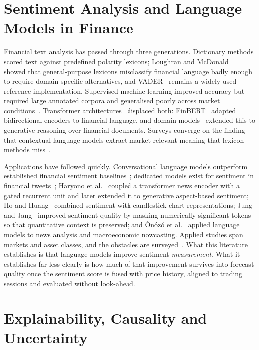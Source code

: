 \section{Sentiment Analysis and Language Models in Finance}

Financial text analysis has passed through three generations. Dictionary methods scored text
against predefined polarity lexicons; Loughran and McDonald~\cite{loughran2011} showed that
general-purpose lexicons misclassify financial language badly enough to require domain-specific
alternatives, and VADER~\cite{hutto2014} remains a widely used reference implementation.
Supervised machine learning improved accuracy but required large annotated corpora and
generalised poorly across market conditions~\cite{rouf2021}. Transformer
architectures~\cite{vaswani2017} displaced both: FinBERT~\cite{araci2019} adapted bidirectional
encoders to financial language, and domain models~\cite{wu2023bloomberggpt,yang2023fingpt,
wang2024fingptbench} extended this to generative reasoning over financial documents. Surveys
converge on the finding that contextual language models extract market-relevant meaning that
lexicon methods miss~\cite{li2024llmsurvey,todd2024,bahoo2024}.

Applications have followed quickly. Conversational language models outperform established
financial sentiment baselines~\cite{fatouros2024}; dedicated models exist for sentiment in
financial tweets~\cite{wilksch2024}; Haryono et al.~\cite{haryono2023,haryono2024} coupled a
transformer news encoder with a gated recurrent unit and later extended it to generative
aspect-based sentiment; Ho and Huang~\cite{ho2021} combined sentiment with candlestick chart
representations; Jung and Jang~\cite{jung2024} improved sentiment quality by masking numerically
significant tokens so that quantitative context is preserved; and \'On\'oz\'o et
al.~\cite{onozo2024} applied language models to news analysis and macroeconomic nowcasting.
Applied studies span markets and asset classes, and the obstacles are
surveyed~\cite{khan2024chatgpt,vargas2022,wang2024spcm,shang2025,elahi2024,mishra2025}. What
this literature establishes is that language models improve sentiment \emph{measurement}. What
it establishes far less clearly is how much of that improvement survives into forecast quality
once the sentiment score is fused with price history, aligned to trading sessions and evaluated
without look-ahead.

\section{Explainability, Causality and Uncertainty}


